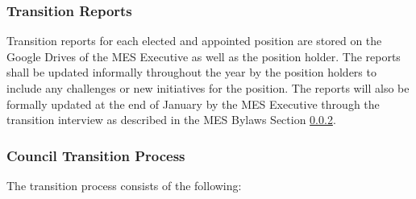 \subsubsection{Transition Reports}
\label{transition-reports}
Transition reports for each elected and appointed position are stored on
the Google Drives of the MES Executive as well as the position holder.
The reports shall be updated informally throughout the year by the
position holders to include any challenges or new initiatives for the
position. The reports will also be formally updated at the end of
January by the MES Executive through the transition interview as
described in the MES Bylaws Section \ref{council-transition-process}. %

\subsubsection{Council Transition Process}
\label{council-transition-process}

The transition process consists of the following:

